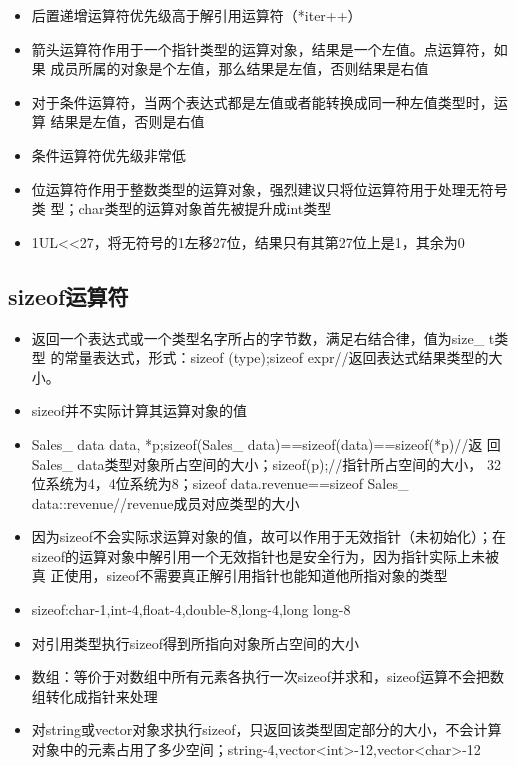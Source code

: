 \documentclass[11pt]{article}
\begin{document}
\begin{itemize}
\item 后置递增运算符优先级高于解引用运算符（*iter++）
\item 箭头运算符作用于一个指针类型的运算对象，结果是一个左值。点运算符，如果
成员所属的对象是个左值，那么结果是左值，否则结果是右值
\item 对于条件运算符，当两个表达式都是左值或者能转换成同一种左值类型时，运算
结果是左值，否则是右值
\item 条件运算符优先级非常低
\item 位运算符作用于整数类型的运算对象，强烈建议只将位运算符用于处理无符号类
型；char类型的运算对象首先被提升成int类型
\item 1UL<<27，将无符号的1左移27位，结果只有其第27位上是1，其余为0
\end{itemize}
\subsection{sizeof运算符}
\label{sec-2-2}
\begin{itemize}
\item 返回一个表达式或一个类型名字所占的字节数，满足右结合律，值为size\_ t类型
的常量表达式，形式：sizeof (type);sizeof expr//返回表达式结果类型的大小。
\item sizeof并不实际计算其运算对象的值
\item Sales\_ data data, *p;sizeof(Sales\_ data)==sizeof(data)==sizeof(*p)//返
回Sales\_ data类型对象所占空间的大小；sizeof(p);//指针所占空间的大小，
32位系统为4，4位系统为8；sizeof data.revenue==sizeof Sales\_
data::revenue//revenue成员对应类型的大小
\item 因为sizeof不会实际求运算对象的值，故可以作用于无效指针（未初始化）；在
sizeof的运算对象中解引用一个无效指针也是安全行为，因为指针实际上未被真
正使用，sizeof不需要真正解引用指针也能知道他所指对象的类型
\item sizeof:char-1,int-4,float-4,double-8,long-4,long long-8
\item 对引用类型执行sizeof得到所指向对象所占空间的大小
\item 数组：等价于对数组中所有元素各执行一次sizeof并求和，sizeof运算不会把数
组转化成指针来处理
\item 对string或vector对象求执行sizeof，只返回该类型固定部分的大小，不会计算
对象中的元素占用了多少空间；string-4,vector<int>-12,vector<char>-12
\end{itemize}
\end{document}
